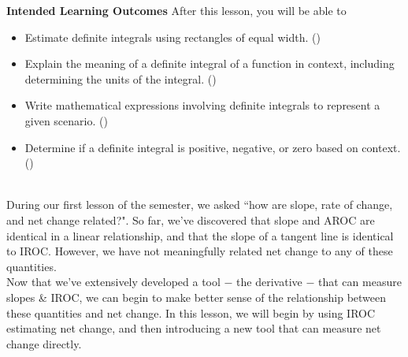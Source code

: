 \documentclass[10pt]{article}
\begin{document}
\pagestyle{otherpages}
\thispagestyle{firstpage}

\textbf{Intended Learning Outcomes}
After this lesson, you will be able to 

\begin{itemize}
    \item Estimate definite integrals using rectangles of equal width. ()
    \item Explain the meaning of a definite integral of a function in context, including determining the units of the integral. ()
    \item Write mathematical expressions involving definite integrals to represent a given scenario. ()
    \item Determine if a definite integral is positive, negative, or zero based on context. ()
\end{itemize}

\vspace{-0.5cm}

\hrulefill\\

During our first lesson of the semester, we asked ``how are slope, rate of change, and net change related?". So far, we've discovered that slope and AROC are identical in a linear relationship, and that the slope of a tangent line is identical to IROC. However, we have not meaningfully related net change to any of these quantities.\\

Now that we've extensively developed a tool $-$ the derivative $-$ that can measure slopes \& IROC, we can begin to make better sense of the relationship between these quantities and net change. In this lesson, we will begin by using IROC estimating net change, and then introducing a new tool that can measure net change directly.\\
\end{document}
